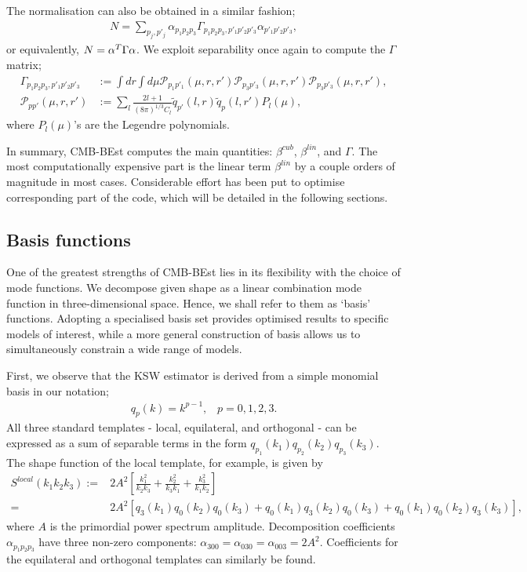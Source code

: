 The normalisation can also be obtained in a similar fashion;
\begin{align}
	N = \sum_{p_j, p'_j} \alpha_{p_1 p_2 p_3} \Gamma_{p_1 p_2 p_3, p'_1 p'_2 p'_3} \alpha_{p'_1 p'_2 p'_3}, \label{eqn:normlisation_from_gamma}
\end{align}
or equivalently, $N = \mathbf{\alpha}^T \Gamma \mathbf{\alpha}$. We exploit separability once again to compute the $\Gamma$ matrix;
\begin{align}
	\Gamma_{p_1 p_2 p_3, p'_1 p'_2 p'_3} &:= \int dr \int d\mu \mathcal{P}_{p_1 p'_1}(\mu, r, r') \mathcal{P}_{p_3 p'_3}(\mu, r, r') \mathcal{P}_{p_3 p'_3}(\mu, r, r'), 	\label{def:gamma} 	\\
	\mathcal{P}_{p p'}(\mu, r, r') &:= \sum_l \frac{2l+1}{(8\pi)^{1/3} C_l} \tilde{q}_{p'}(l,r) \tilde{q}_p(l,r') P_l(\mu),
\end{align}
where $P_l(\mu)$'s are the Legendre polynomials.

In summary, CMB-BEst computes the main quantities: $\beta^{cub}$, $\beta^{lin}$, and $\Gamma$. The most computationally expensive part is the linear term $\beta^{lin}$ by a couple orders of magnitude in most cases. Considerable effort has been put to optimise corresponding part of the code, which will be detailed in the following sections.

\subsection{Basis functions} \label{section:basis_functions}

One of the greatest strengths of CMB-BEst lies in its flexibility with the choice of mode functions. We decompose given shape as a linear combination mode function in three-dimensional space. Hence, we shall refer to them as `basis' functions. Adopting a specialised basis set provides optimised results to specific models of interest, while a more general construction of basis allows us to simultaneously constrain a wide range of models.

First, we observe that the KSW estimator \cite{Komatsu2005} is derived from a simple monomial basis in our notation;
\begin{align}
	q_p(k) = k^{p-1}, \;\;\; p = 0, 1, 2, 3.
\end{align}
All three standard templates - local, equilateral, and orthogonal - can be expressed as a sum of separable terms in the form $q_{p_1}(k_1) q_{p_2}(k_2) q_{p_3}(k_3)$. The shape function of the local template, for example, is given by
\begin{align}
	S^{local}(k_1 k_2 k_3) :=& 2A^2 \left[ \frac{k_1^2}{k_2 k_3} + \frac{k_2^2}{k_3 k_1} + \frac{k_3^2}{k_1 k_2}  \right] \\
	=& 2A^2 \left[q_3(k_1)q_0(k_2)q_0(k_3) + q_0(k_1)q_3(k_2)q_0(k_3) + q_0(k_1)q_0(k_2)q_3(k_3) \right],
\end{align}
where $A$ is the primordial power spectrum amplitude. Decomposition coefficients $\alpha_{p_1 p_2 p_3}$ have three non-zero components: $\alpha_{300} = \alpha_{030} = \alpha_{003} = 2A^2$. Coefficients for the equilateral and orthogonal templates can similarly be found.

